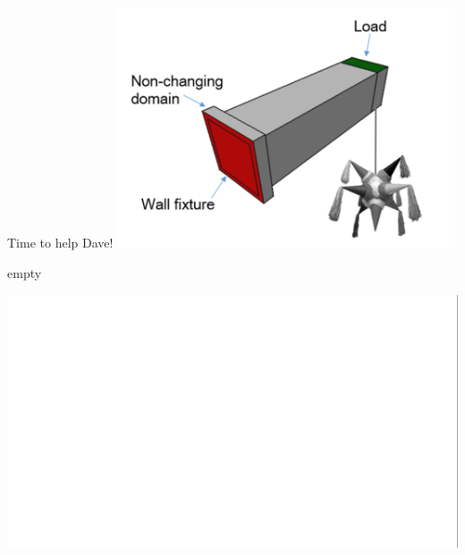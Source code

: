 \begin{frame}{Time to help Dave!}
	\includegraphics[width=0.75\textwidth, center]{Pictures/FirstHalf/pinata_new}
\end{frame}

\begin{pagestyle}{empty}
\begin{frame}
	\includegraphics[width=18.3\textwidth, center]{Pictures/FirstHalf/white_background}
\end{frame}
\end{pagestyle}
